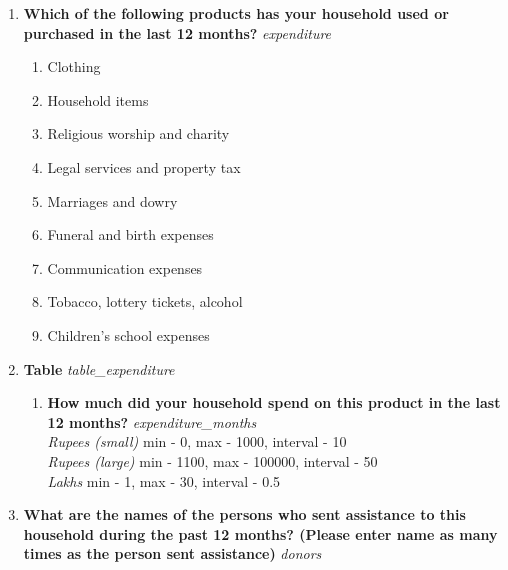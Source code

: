 \documentclass{article}
\begin{document}
\begin{enumerate}
\item {\bfseries Which of the following products has your household used or purchased in the last 12 months? }\emph{ expenditure } 
\begin{enumerate} 
\item Clothing 
\item Household items 
\item Religious worship and charity 
\item Legal services and property tax 
\item Marriages and dowry 
\item Funeral and birth expenses 
\item Communication expenses 
\item Tobacco, lottery tickets, alcohol 
\item Children's school expenses 
\end{enumerate} 
\item {\bfseries Table}\emph{ table\_expenditure } 
\begin{enumerate}[label*=\arabic*.] 
\item {\bfseries How much did your household spend on this product in the last 12 months?}\emph{ expenditure\_months } 
\\ \emph{ Rupees (small) }min - 0, max - 1000, interval - 10 
\\ \emph{ Rupees (large) }min - 1100, max - 100000, interval - 50 
\\ \emph{ Lakhs }min - 1, max - 30, interval - 0.5 
 
\end{enumerate} 
\item {\bfseries What are the names of the persons who sent assistance to this household during the past 12 months? (Please enter name as many times as the person sent assistance)}\emph{ donors } 
 

\end{enumerate}
\end{document}
